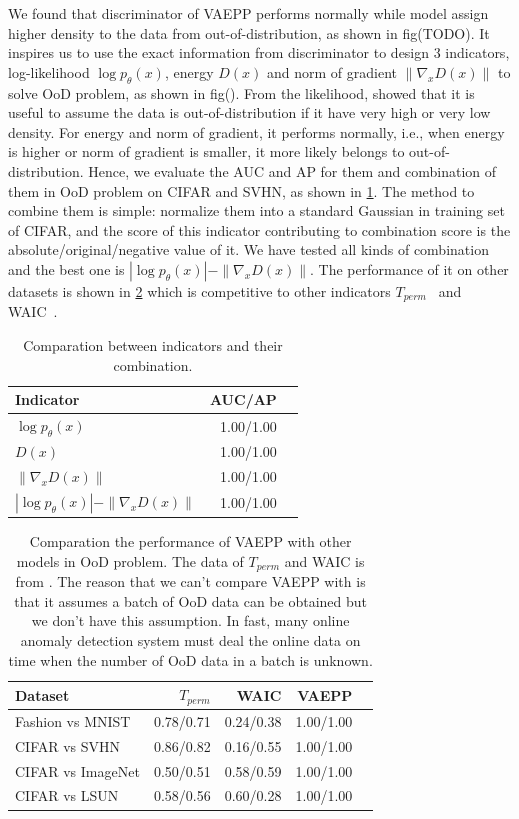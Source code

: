 We found that discriminator of VAEPP performs normally while model assign higher density to the data from out-of-distribution, as shown in fig(TODO). It inspires us to use the exact information from discriminator to design 3 indicators, log-likelihood $\log p_\theta(x)$, energy $D(x)$ and norm of gradient $\|\nabla_{x} D(x)\|$ to solve OoD problem, as shown in fig(). From the likelihood, \cite{song2017pixeldefend} showed that it is useful to assume the data is out-of-distribution if it have very high or very low density. For energy and norm of gradient, it performs normally, i.e., when energy is higher or norm of gradient is smaller, it more likely belongs to out-of-distribution. Hence, we evaluate the AUC and AP for them and combination of them in OoD problem on CIFAR and SVHN, as shown in \cref{tab:compare_ood}. The method to combine them is simple: normalize them into a standard Gaussian in training set of CIFAR, and the score of this indicator contributing to combination score is the absolute/original/negative value of it. We have tested all kinds of combination and the best one is $|\log p_\theta(x)| - \|\nabla_x D(x)\|$. The performance of it on other datasets is shown in \cref{tab:compare_ood_other_datasets} which is competitive to other indicators $T_{perm}$~\cite{song2017pixeldefend} and WAIC~\cite{choi2018waic}. 
\begin{table}[tb]
\centering
\begin{tabular}{lrr}  
\toprule
Indicator  & AUC/AP \\
\midrule
$\log p_\theta(x)$   &  1.00/1.00      \\
$D(x)$               &  1.00/1.00      \\
$\|\nabla_x D(x)\|$  &  1.00/1.00      \\
$|\log p_\theta(x)| - \|\nabla_x D(x)\|$ & 1.00/1.00 \\
\bottomrule
\end{tabular}
\caption{Comparation between indicators and their combination.}
\label{tab:compare_ood}
\end{table}
\begin{table}[tb]
\centering
\begin{tabular}{lrrrr}  
\toprule
Dataset  &  $T_{perm}$ & WAIC & VAEPP\\
\midrule
Fashion vs MNIST  & 0.78/0.71  & 0.24/0.38 & 1.00/1.00  \\
CIFAR vs SVHN     & 0.86/0.82  & 0.16/0.55 & 1.00/1.00  \\
CIFAR vs ImageNet & 0.50/0.51  & 0.58/0.59 & 1.00/1.00  \\
CIFAR vs LSUN     & 0.58/0.56  & 0.60/0.28 & 1.00/1.00  \\
\bottomrule
\end{tabular}
\caption{Comparation the performance of VAEPP with other models in OoD problem. The data of $T_{perm}$ and WAIC is from \protect \cite{song2019unsupervised}. The reason that we can't compare VAEPP with \protect\cite{song2019unsupervised} is that it assumes a batch of OoD data can be obtained but we don't have this assumption. In fast, many online anomaly detection system must deal the online data on time when the number of OoD data in a batch is unknown. }
\label{tab:compare_ood_other_datasets}
\end{table}

